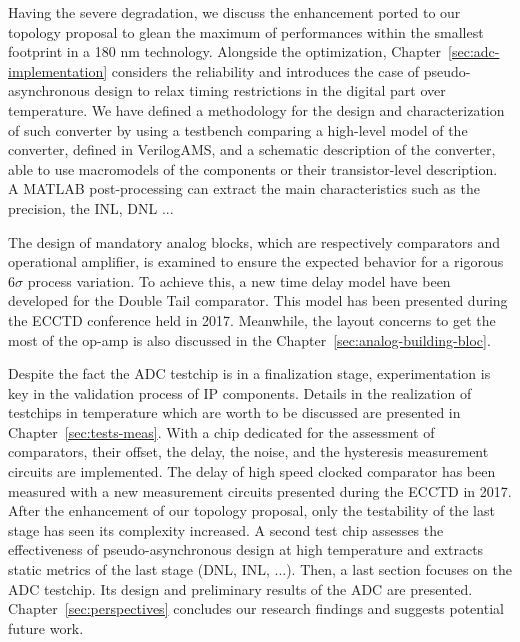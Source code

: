 Having the severe degradation, we discuss the enhancement ported to our topology proposal to glean the maximum of performances within the smallest footprint in a 180 nm technology. Alongside the optimization, Chapter~\ref{sec:adc-implementation} considers the reliability and introduces the case of pseudo-asynchronous design to relax timing restrictions in the digital part over temperature. We have defined a methodology for the design and characterization of such converter by using a testbench comparing a high-level model of the converter, defined in VerilogAMS, and a schematic description of the converter, able to use macromodels of the components or their transistor-level description. A MATLAB post-processing can extract the main characteristics such as the precision, the INL, DNL ...

The design of mandatory analog blocks, which are respectively comparators and operational amplifier, is examined to ensure the expected behavior for a rigorous 6\(\sigma\) process variation. To achieve this, a new time delay model have been developed for the Double Tail comparator. This model has been presented during the ECCTD conference held in 2017. Meanwhile, the layout concerns to get the most of the op-amp is also discussed in the Chapter~\ref{sec:analog-building-bloc}.

Despite the fact the ADC testchip is in a finalization stage, experimentation is key in the validation process of IP components. Details in the realization of testchips in temperature which are worth to be discussed are presented in Chapter~\ref{sec:tests-meas}. With a chip dedicated for the assessment of comparators, their offset, the delay, the noise, and the hysteresis measurement circuits are implemented. The delay of high speed clocked comparator has been measured with a new measurement circuits presented during the ECCTD in 2017. After the enhancement of our topology proposal, only the testability of the last stage has seen its complexity increased. A second test chip assesses the effectiveness of pseudo-asynchronous design at high temperature and extracts static metrics of the last stage (DNL, INL, ...). Then, a last section focuses on the ADC testchip. Its design and preliminary results of the ADC are presented. Chapter~\ref{sec:perspectives} concludes our research findings and suggests potential future work.
